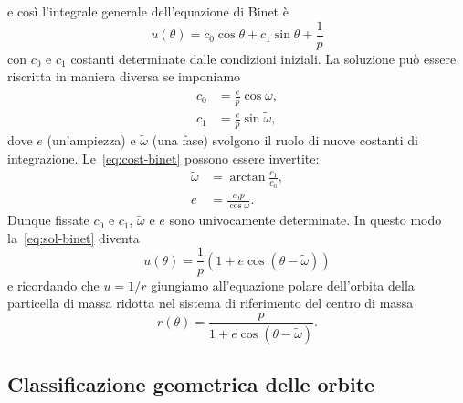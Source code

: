 e così l'integrale generale dell'equazione di Binet è
\begin{equation}
  \label{eq:sol-binet}
  u(\theta) = c_0\cos\theta + c_1\sin\theta + \frac{1}{p}
\end{equation}
con $c_0$ e $c_1$ costanti determinate dalle condizioni iniziali. La soluzione
può essere riscritta in maniera diversa se imponiamo
\begin{subequations}
  \label{eq:cost-binet}
  \begin{align}
    c_0 &= \frac{e}{p}\cos\tilde\omega, \\
    c_1 &= \frac{e}{p}\sin\tilde\omega,
  \end{align}
\end{subequations}
dove $e$ (un'ampiezza) e $\tilde\omega$ (una fase) svolgono il ruolo di nuove
costanti di integrazione. Le~\eqref{eq:cost-binet} possono essere invertite:
\begin{subequations}
  \begin{align}
    \tilde\omega &= \arctan \frac{c_1}{c_0}, \\
    e &= \frac{c_0p}{\cos\omega}.
  \end{align}
\end{subequations}
Dunque fissate $c_0$ e $c_1$, $\tilde\omega$ e $e$ sono univocamente
determinate. In questo modo la~\eqref{eq:sol-binet} diventa
\begin{equation}
  u(\theta) = \frac{1}{p}(1+e\cos(\theta-\tilde\omega))
\end{equation}
e ricordando che $u=1/r$ giungiamo all'equazione polare dell'orbita della
particella di massa ridotta nel sistema di riferimento del centro di massa
\begin{equation}
  \label{eq:orbita}
  r(\theta) = \frac{p}{1+e\cos(\theta-\tilde\omega)}.
\end{equation}

\subsection{Classificazione geometrica delle orbite}
\label{sec:class-geom-orbite}

